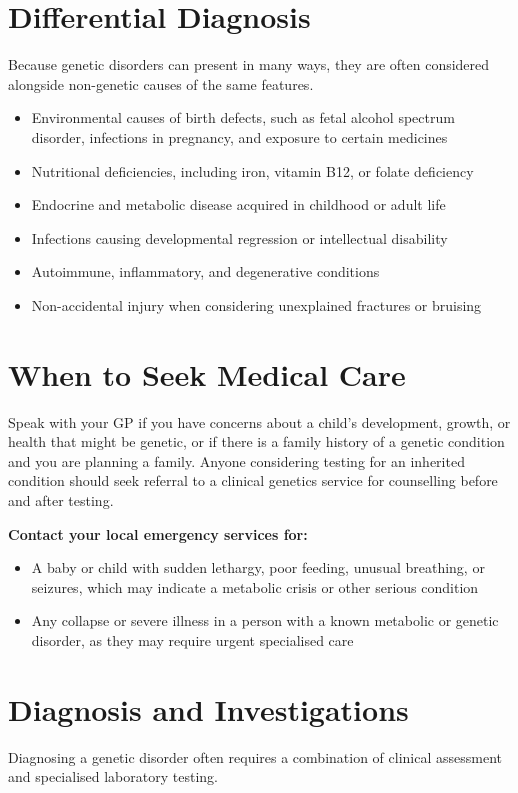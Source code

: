 \section*{Differential Diagnosis}
Because genetic disorders can present in many ways, they are often considered alongside non-genetic causes of the same features.

\begin{itemize}
    \item Environmental causes of birth defects, such as fetal alcohol spectrum disorder, infections in pregnancy, and exposure to certain medicines
    \item Nutritional deficiencies, including iron, vitamin B12, or folate deficiency
    \item Endocrine and metabolic disease acquired in childhood or adult life
    \item Infections causing developmental regression or intellectual disability
    \item Autoimmune, inflammatory, and degenerative conditions
    \item Non-accidental injury when considering unexplained fractures or bruising
\end{itemize}

\section*{When to Seek Medical Care}
Speak with your GP if you have concerns about a child's development, growth, or health that might be genetic, or if there is a family history of a genetic condition and you are planning a family. Anyone considering testing for an inherited condition should seek referral to a clinical genetics service for counselling before and after testing.

\textbf{Contact your local emergency services for:}
\begin{itemize}
    \item A baby or child with sudden lethargy, poor feeding, unusual breathing, or seizures, which may indicate a metabolic crisis or other serious condition
    \item Any collapse or severe illness in a person with a known metabolic or genetic disorder, as they may require urgent specialised care
\end{itemize}

\section*{Diagnosis and Investigations}
Diagnosing a genetic disorder often requires a combination of clinical assessment and specialised laboratory testing.

